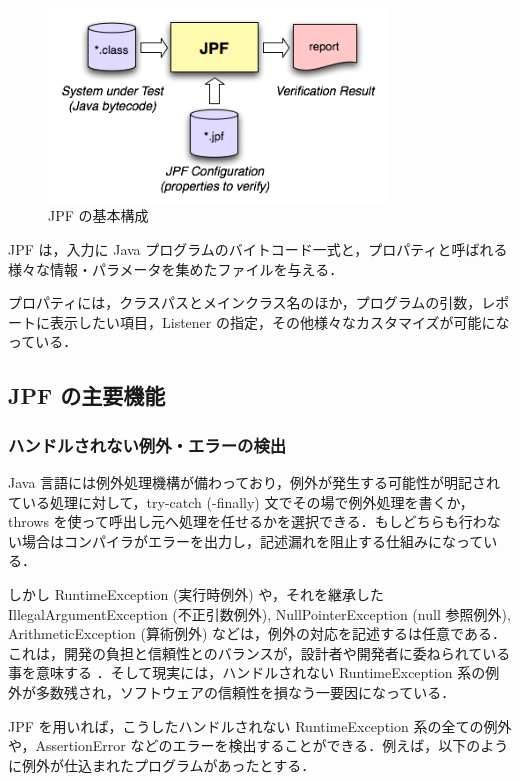 \documentclass[a4j,12pt]{jarticle}
\begin{document}
\begin{figure}[here]
\centering
\includegraphics[width=9cm]{images/jpf-basic.png}
\caption{JPF の基本構成 \cite{JPF}}
\label{figure:jpf-basic}
\end{figure}

JPF は，入力に Java プログラムのバイトコード一式と，プロパティと呼ばれる様々な情報・パラメータを集めたファイルを与える．

プロパティには，クラスパスとメインクラス名のほか，プログラムの引数，レポートに表示したい項目，Listener の指定，その他様々なカスタマイズが可能になっている．

\subsection{JPF の主要機能}

\subsubsection{ハンドルされない例外・エラーの検出}

Java 言語には例外処理機構が備わっており，例外が発生する可能性が明記されている処理に対して，try-catch (-finally) 文でその場で例外処理を書くか， throws を使って呼出し元へ処理を任せるかを選択できる．もしどちらも行わない場合はコンパイラがエラーを出力し，記述漏れを阻止する仕組みになっている．

しかし RuntimeException (実行時例外) や，それを継承した IllegalArgumentException (不正引数例外), NullPointerException (null 参照例外), ArithmeticException (算術例外) などは，例外の対応を記述するは任意である．これは，開発の負担と信頼性とのバランスが，設計者や開発者に委ねられている事を意味する \cite{JavaTGP}．そして現実には，ハンドルされない RuntimeException 系の例外が多数残され，ソフトウェアの信頼性を損なう一要因になっている．

JPF を用いれば，こうしたハンドルされない RuntimeException 系の全ての例外や，AssertionError などのエラーを検出することができる．例えば，以下のように例外が仕込まれたプログラムがあったとする．
\end{document}
